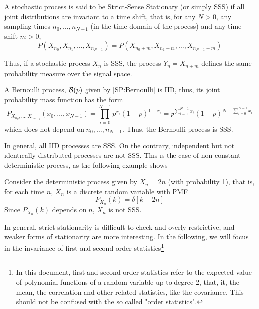 \begin{definition}
A stochastic process is said to be Strict-Sense Stationary (or simply SSS) if all joint distributions are invariant to a time shift, that is, for any $N>0$, any sampling times $n_0, \ldots, n_{N-1}$ (in the time domain of the process) and any time shift $m > 0$, 
\begin{equation}
\label{ec:strict}
P(X_{n_0},X_{n_1}, \ldots, X_{n_{N-1}}) = P(X_{n_0 + m}, X_{n_1 +m}, \ldots, X_{n_{N-1}+m})
\end{equation}
\end{definition}

Thus, if a stochastic process $X_n$ is SSS, the process $Y_n = X_{n+m}$ defines the same probability measure over the signal space. 

\begin{example}
\label{Ex:BinaryRandom}

A Bernoulli process, ${\cal B}(p)$ given by \eqref{SP:Bernoulli} is IID, thus, its joint probability mass function has the form
\begin{equation}
P_{X_{n_0},\ldots,X_{n_{N-1}}}(x_0,\ldots,x_{N-1})
    = \prod_{i=0}^{N-1} p^{x_i} (1-p)^{1-x_i}
    = p^{\sum_{i=0}^{N-1}x_i} (1-p)^{N - \sum_{i=0}^{N-1}x_i}
\label{ec:PbOrderN}
\end{equation}
which does not depend on $n_0, \ldots, n_{N-1}$. Thus, the Bernoulli process is SSS. 
 
\end{example}

In general, all IID processes are SSS. On the contrary, independent but not identically distributed processes are not SSS. This is the case of non-constant deterministic process, as the following example shows

\begin{example}
\label{Ex:SPdeterministic}

Consider the deterministic process given by $X_n = 2 n$ (with probability 1), that is, for each time $n$, $X_n$ is a discrete random variable with PMF
\begin{equation}
P_{X_n}(k) = \delta[k-2 n]
\end{equation}
Since $P_{X_n}(k)$ depends on $n$, $X_n$ is not SSS.

\end{example}

In general, strict stationarity is difficult to check and overly restrictive, and weaker forms of stationarity are more interesting. In the following, we will focus in the invariance of first and second order statistics\footnote{In this document, first and second order statistics refer to the expected value of polynomial functions of a random variable up to degree 2, that, it, the mean, the correlation and other related statistics, like the covariance. This should not be confused with the so called "order statistics".}


